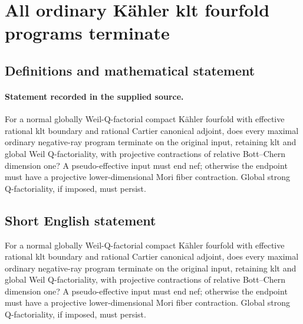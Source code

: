\documentclass[11pt]{article}
\begin{document}
\section*{All ordinary Kähler klt fourfold programs terminate}\label{statement}
\subsection{Definitions and mathematical statement}
\paragraph{Statement recorded in the supplied source.}
For a normal globally Weil-Q-factorial compact Kähler fourfold with effective rational klt boundary and rational Cartier canonical adjoint, does every maximal ordinary negative-ray program terminate on the original input, retaining klt and global Weil Q-factoriality, with projective contractions of relative Bott–Chern dimension one? A pseudo-effective input must end nef; otherwise the endpoint must have a projective lower-dimensional Mori fiber contraction. Global strong Q-factoriality, if imposed, must persist.
\subsection{Short English statement}
For a normal globally Weil-Q-factorial compact Kähler fourfold with effective rational klt boundary and rational Cartier canonical adjoint, does every maximal ordinary negative-ray program terminate on the original input, retaining klt and global Weil Q-factoriality, with projective contractions of relative Bott–Chern dimension one? A pseudo-effective input must end nef; otherwise the endpoint must have a projective lower-dimensional Mori fiber contraction. Global strong Q-factoriality, if imposed, must persist.
\end{document}
